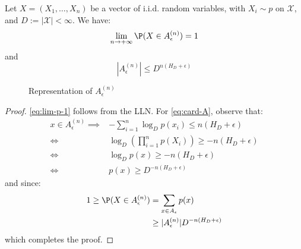 \documentclass{../cs-classes/cs-classes}
\newcommand*{\X}{\mathcal{X}}
\begin{document}
\begin{property}
    \label{prop:typ-seq-concentrate}
    Let $X=(X_1, \dots, X_n)$ be a vector of i.i.d. random variables, with $X_i\sim p$ on $\X$, and $D:=|\X|<\infty$. We have:
    \begin{equation}
        \label{eq:lim-p-1}
        \lim_{n\to+\infty}\P(X\in A_\epsilon^{(n)})=1
    \end{equation}
    and
    \begin{equation}
        \label{eq:card-A}
        |A_\epsilon^{(n)}|\leq D^{n(H_D+\epsilon)}
    \end{equation}
    \begin{figure}
        \center
        \caption{Representation of $A_\epsilon^{(n)}$}
    \end{figure}
\end{property}

\begin{proof}
    \eqref{eq:lim-p-1} follows from the LLN. For \eqref{eq:card-A}, observe that:
    \begin{equation*}
        \begin{aligned}
            x\in A_\epsilon^{(n)}\implies& -\sum_{i=1}^n \log_D p(x_i)\leq n(H_D+\epsilon)\\
            \iff&\log_D\left(\prod_{i=1}^n p(X_i)\right)\geq -n(H_D+\epsilon)\\
            \iff&\log_Dp(x)\geq -n(H_D+\epsilon)\\
            \iff&p(x)\geq D^{-n(H_D+\epsilon)}
        \end{aligned}
    \end{equation*}
    and since:
    \begin{equation*}
        \begin{aligned}
            1\geq \P(X\in A_\epsilon^{(n)})&=\sum_{x\in A_\epsilon}p(x)\\
            &\geq |A_\epsilon^{(n)}|D^{-n(H_D+\epsilon)}
        \end{aligned}
    \end{equation*}
    which completes the proof.
\end{proof}
\end{document}
